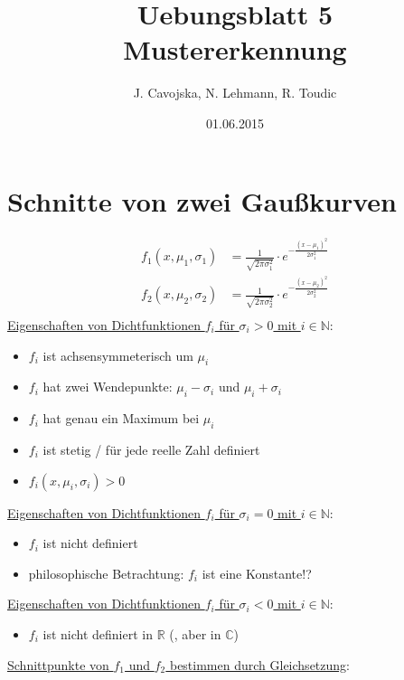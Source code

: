 \documentclass[12pt]{article}
\title{Uebungsblatt 5\\ \glqq Mustererkennung\grqq}
\author{J. Cavojska, N. Lehmann, R. Toudic}
\date{01.06.2015}
\begin{document}
\maketitle
\tableofcontents
\newpage

\section{Schnitte von zwei Gau\ss kurven}

\begin{align*}
f_1(x,\mu_1,\sigma_1) &= \frac{1}{\sqrt{2 \pi \sigma_1^2}} \cdot e^{-\frac{(x-\mu_1)^2}{2 \sigma_1^2}}\\
f_2(x,\mu_2,\sigma_2) &= \frac{1}{\sqrt{2 \pi \sigma_2^2}} \cdot e^{-\frac{(x-\mu_2)^2}{2 \sigma_2^2}}\\
\end{align*}
\underline{Eigenschaften von Dichtfunktionen $f_i$ f\"ur $\sigma_i > 0$ mit $i \in \mathbb{N}$}:
\begin{itemize}
\item $f_i$ ist achsensymmeterisch um $\mu_i$
\item $f_i$ hat zwei Wendepunkte: $\mu_i - \sigma_i$ und $\mu_i + \sigma_i$
\item $f_i$ hat genau ein Maximum bei $\mu_i$
\item $f_i$ ist stetig / f\"ur jede reelle Zahl definiert
\item $f_i(x,\mu_i,\sigma_i) > 0$
\end{itemize}
\underline{Eigenschaften von Dichtfunktionen $f_i$ f\"ur $\sigma_i = 0$ mit $i \in \mathbb{N}$}:
\begin{itemize}
\item $f_i$ ist nicht definiert
\item philosophische Betrachtung: $f_i$ ist eine Konstante!?
\end{itemize}
\underline{Eigenschaften von Dichtfunktionen $f_i$ f\"ur $\sigma_i < 0$ mit $i \in \mathbb{N}$}:
\begin{itemize}
\item $f_i$ ist nicht definiert in $\mathbb{R}$ (, aber in $\mathbb{C}$)
\end{itemize}
\newpage
\underline{Schnittpunkte von $f_1$ und $f_2$ bestimmen durch Gleichsetzung}:
\end{document}
